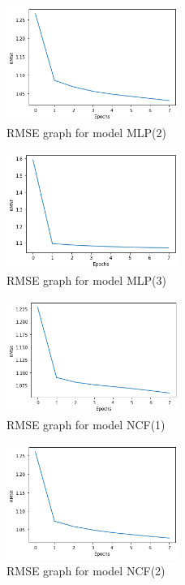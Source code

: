 \documentclass[final]{cvpr}
\begin{document}
\begin{figure}
	\includegraphics[width=0.5\textwidth]{mlp_2.png}
	\caption{RMSE graph for model MLP(2)}
\end{figure}

\begin{figure}
	\includegraphics[width=0.5\textwidth]{mlp_3.png}
	\caption{RMSE graph for model MLP(3)}
\end{figure}

\begin{figure}
	\includegraphics[width=0.5\textwidth]{ncf_1.png}
	\caption{RMSE graph for model NCF(1)}
\end{figure}

\begin{figure}
	\includegraphics[width=0.5\textwidth]{ncf_2.png}
	\caption{RMSE graph for model NCF(2)}
\end{figure}
\end{document}
